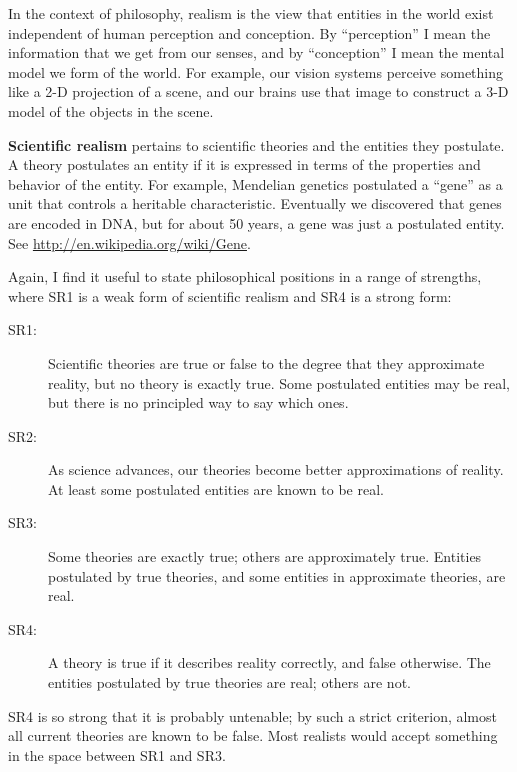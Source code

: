 \documentclass[10pt]{book}
\begin{document}
In the context of philosophy, realism is the view that entities
in the world exist independent of human perception and conception.
By ``perception'' I mean the information that we get from
our senses, and by ``conception'' I mean the mental model
we form of the world.  For example, our vision systems perceive
something like a 2-D projection of a scene, and our brains
use that image to construct a 3-D model of the objects in the
scene.

{\bf Scientific realism} pertains to scientific theories and the
entities they postulate.
A theory postulates an entity if it is
expressed in terms of the properties and behavior of the entity.  For
example, Mendelian genetics postulated a ``gene'' as a unit that
controls a heritable characteristic.  Eventually we discovered that
genes are encoded in DNA, but for about 50 years, a gene was just a
postulated entity.  See \url{http://en.wikipedia.org/wiki/Gene}.

Again, I find it useful to state philosophical positions in a range of
strengths, where SR1 is a weak form of scientific realism and SR4 is a
strong form:

\begin{description}

\item[SR1:] Scientific theories are true or false to the degree that
  they approximate reality, but no theory is exactly true.  Some
  postulated entities may be real, but there is no principled way to
  say which ones.

\item[SR2:] As science advances, our theories become better
  approximations of reality.  At least some postulated entities are
  known to be real.

\item[SR3:] Some theories are exactly true; others are approximately
  true.  Entities postulated by true theories, and some entities
  in approximate theories, are real.

\item[SR4:] A theory is true if it describes reality correctly, and
  false otherwise.  The entities postulated by true theories are real;
  others are not.

\end{description}

SR4 is so strong that it is probably untenable; by such a strict
criterion, almost all current theories are known to be false.  
Most realists would accept something in the space
between SR1 and SR3.
\end{document}
